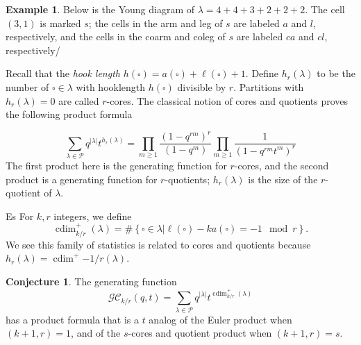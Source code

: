 \documentclass{amsart}[12pt]
\theoremstyle{definition}
\newtheorem{example}[dummy]{Example}
\newtheorem{conjecture}[dummy]{Conjecture}
\newcommand{\PP}{\mathcal{P}} %
\DeclareMathOperator{\cdim}{cdim}
\newcommand{\Gcomb}{\mathcal{GC}}
\begin{document}
\begin{example}
Below is the Young diagram of $\lambda=4+4+3+2+2+2$.  The cell $(3,1)$ is marked $s$; the cells in the arm and leg of $s$ are labeled $a$ and $l$, respectively, and the cells in the coarm and coleg of $s$ are labeled $ca$ and $cl$, respectively/
\begin{center}
\end{center}
\end{example}


Recall that the \emph{hook length} $h(\square)=a(\square)+\ell(\square)+1$.  Define $h_r(\lambda)$ to be the number of $\square\in\lambda$ with hooklength $h(\square)$ divisible by $r$.  Partitions with $h_r(\lambda)=0$ are called $r$-cores.  The classical notion of cores and quotients proves the following product formula

\[\sum_{\lambda\in\PP} q^{|\lambda|}t^{h_r(\lambda)}=\prod_{m\geq 1} \frac{(1-q^{rm})^r}{(1-q^m)}\prod_{m\geq 1}\frac{1}{(1-q^{rm}t^m)^r}\]
The first product here is the generating function for $r$-cores, and the second product is a generating function for $r$-quotients; $h_r(\lambda)$ is the size of the $r$-quotient of $\lambda$.  

Es
For $k, r$ integers, we define
\[\cdim^+_{k/r}(\lambda)=\#\left\{\square\in\lambda \Big | \ell(\square)-k a(\square)=-1 \mod r\right\}. \]
We see this family of statistics is related to cores and quotients because $h_r(\lambda)=\cdim^+{-1/r}(\lambda)$.

\begin{conjecture}
  The generating function
  \[ \Gcomb_{k/r}(q,t)=\sum_{\lambda\in\PP}q^{|\lambda|}t^{\cdim^+_{k/r}(\lambda)}\]
has a product formula that is a $t$ analog of the Euler product when $(k+1,r)=1$, and of the $s$-cores and quotient product when $(k+1,r)=s$.
\end{conjecture}
\end{document}
